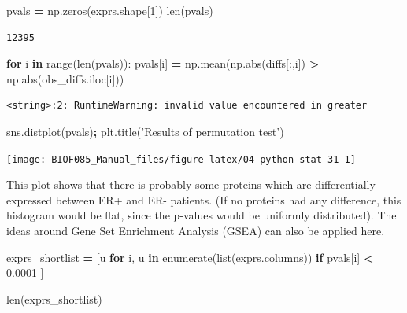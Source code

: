\documentclass[
  letterpaper,
]{scrbook}
\newenvironment{Shaded}{\begin{snugshade}}{\end{snugshade}}
\newcommand{\BuiltInTok}[1]{#1}
\newcommand{\ControlFlowTok}[1]{\textcolor[rgb]{0.13,0.29,0.53}{\textbf{#1}}}
\newcommand{\DecValTok}[1]{\textcolor[rgb]{0.00,0.00,0.81}{#1}}
\newcommand{\FloatTok}[1]{\textcolor[rgb]{0.00,0.00,0.81}{#1}}
\newcommand{\KeywordTok}[1]{\textcolor[rgb]{0.13,0.29,0.53}{\textbf{#1}}}
\newcommand{\NormalTok}[1]{#1}
\newcommand{\OperatorTok}[1]{\textcolor[rgb]{0.81,0.36,0.00}{\textbf{#1}}}
\newcommand{\StringTok}[1]{\textcolor[rgb]{0.31,0.60,0.02}{#1}}
\begin{document}
\begin{Shaded}
\begin{Highlighting}[]
\NormalTok{pvals }\OperatorTok{=}\NormalTok{ np.zeros(exprs.shape[}\DecValTok{1}\NormalTok{])}
\BuiltInTok{len}\NormalTok{(pvals)}
\end{Highlighting}
\end{Shaded}

\begin{verbatim}
12395
\end{verbatim}

\begin{Shaded}
\begin{Highlighting}[]
\ControlFlowTok{for}\NormalTok{ i }\KeywordTok{in} \BuiltInTok{range}\NormalTok{(}\BuiltInTok{len}\NormalTok{(pvals)):}
\NormalTok{    pvals[i] }\OperatorTok{=}\NormalTok{ np.mean(np.}\BuiltInTok{abs}\NormalTok{(diffs[:,i]) }\OperatorTok{>}\NormalTok{ np.}\BuiltInTok{abs}\NormalTok{(obs_diffs.iloc[i]))}
\end{Highlighting}
\end{Shaded}

\begin{verbatim}
<string>:2: RuntimeWarning: invalid value encountered in greater
\end{verbatim}

\begin{Shaded}
\begin{Highlighting}[]
\NormalTok{sns.distplot(pvals)}\OperatorTok{;}
\NormalTok{plt.title(}\StringTok{'Results of permutation test'}\NormalTok{)}
\end{Highlighting}
\end{Shaded}

\begin{center}\texttt{[image: BIOF085\_Manual\_files/figure-latex/04-python-stat-31-1]} \end{center}

This plot shows that there is probably some proteins which are differentially expressed between ER+ and ER- patients. (If no proteins had any difference, this histogram would be flat, since the p-values would be uniformly distributed). The ideas around Gene Set Enrichment Analysis (GSEA) can also be applied here.

\begin{Shaded}
\begin{Highlighting}[]
\NormalTok{exprs_shortlist }\OperatorTok{=}\NormalTok{ [u }\ControlFlowTok{for}\NormalTok{ i, u }\KeywordTok{in} \BuiltInTok{enumerate}\NormalTok{(}\BuiltInTok{list}\NormalTok{(exprs.columns)) }
                   \ControlFlowTok{if}\NormalTok{ pvals[i] }\OperatorTok{<} \FloatTok{0.0001}\NormalTok{ ]}

\BuiltInTok{len}\NormalTok{(exprs_shortlist)}
\end{Highlighting}
\end{Shaded}
\end{document}
